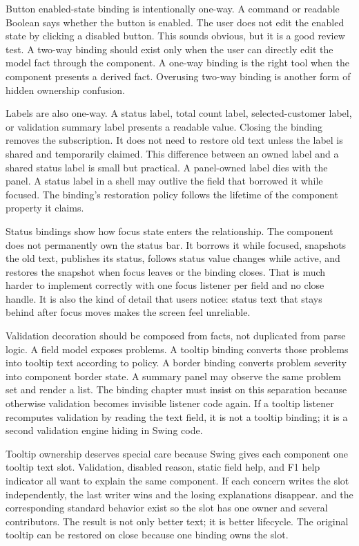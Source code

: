 Button enabled-state binding is intentionally one-way. A command or readable
Boolean says whether the button is enabled. The user does not edit the enabled
state by clicking a disabled button. This sounds obvious, but it is a good
review test. A two-way binding should exist only when the user can directly edit
the model fact through the component. A one-way binding is the right tool when
the component presents a derived fact. Overusing two-way binding is another
form of hidden ownership confusion.

Labels are also one-way. A status label, total count label, selected-customer
label, or validation summary label presents a readable value. Closing the
binding removes the subscription. It does not need to restore old text unless
the label is shared and temporarily claimed. This difference between an owned
label and a shared status label is small but practical. A panel-owned label dies
with the panel. A status label in a shell may outlive the field that borrowed
it while focused. The binding's restoration policy follows the lifetime of the
component property it claims.

Status bindings show how focus state enters the relationship. The component
does not permanently own the status bar. It borrows it while focused, snapshots
the old text, publishes its status, follows status value changes while active,
and restores the snapshot when focus leaves or the binding closes. That is much
harder to implement correctly with one focus listener per field and no close
handle. It is also the kind of detail that users notice: status text that stays
behind after focus moves makes the screen feel unreliable.

Validation decoration should be composed from facts, not duplicated from parse
logic. A field model exposes problems. A tooltip binding converts those
problems into tooltip text according to policy. A border binding converts
problem severity into component border state. A summary panel may observe the
same problem set and render a list. The binding chapter must insist on this
separation because otherwise validation becomes invisible listener code again.
If a tooltip listener recomputes validation by reading the text field, it is
not a tooltip binding; it is a second validation engine hiding in Swing code.

Tooltip ownership deserves special care because Swing gives each component one
tooltip text slot. Validation, disabled reason, static field help, and F1 help
indicator all want to explain the same component. If each concern writes the
slot independently, the last writer wins and the losing explanations disappear.
 and the corresponding standard behavior
exist so the slot has one owner and several contributors. The result is not
only better text; it is better lifecycle. The original tooltip can be restored
on close because one binding owns the slot.

